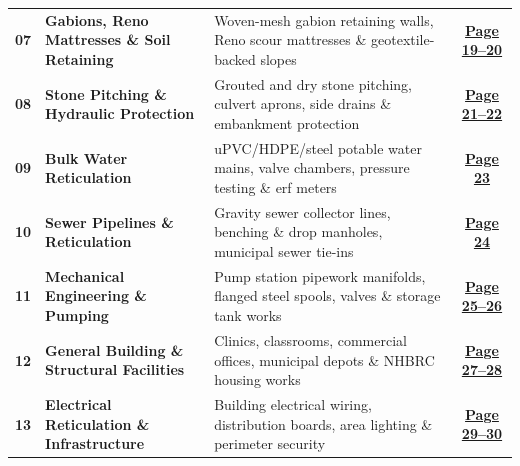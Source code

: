 \documentclass[a4paper,11pt]{article}
\begin{document}
\begin{tabularx}{\textwidth}{@{}l p{4.6cm} X c@{}}
\rowcolor{mhbluelight}
\fontsize{7.5pt}{9.1pt}\selectfont\bfseries 07 & \fontsize{7.5pt}{9.1pt}\selectfont\bfseries Gabions, Reno Mattresses \& Soil Retaining & \fontsize{7.5pt}{9.1pt}\selectfont Woven-mesh gabion retaining walls, Reno scour mattresses \& geotextile-backed slopes & \fontsize{7.5pt}{9.1pt}\selectfont\hyperlink{sec:gabions}{\bfseries\color{mhblue}Page 19--20} \\
\fontsize{7.5pt}{9.1pt}\selectfont\bfseries 08 & \fontsize{7.5pt}{9.1pt}\selectfont\bfseries Stone Pitching \& Hydraulic Protection & \fontsize{7.5pt}{9.1pt}\selectfont Grouted and dry stone pitching, culvert aprons, side drains \& embankment protection & \fontsize{7.5pt}{9.1pt}\selectfont\hyperlink{sec:pitching}{\bfseries\color{mhblue}Page 21--22} \\
\rowcolor{mhbluelight}
\fontsize{7.5pt}{9.1pt}\selectfont\bfseries 09 & \fontsize{7.5pt}{9.1pt}\selectfont\bfseries Bulk Water Reticulation & \fontsize{7.5pt}{9.1pt}\selectfont uPVC/HDPE/steel potable water mains, valve chambers, pressure testing \& erf meters & \fontsize{7.5pt}{9.1pt}\selectfont\hyperlink{sec:waterretic}{\bfseries\color{mhblue}Page 23} \\
\fontsize{7.5pt}{9.1pt}\selectfont\bfseries 10 & \fontsize{7.5pt}{9.1pt}\selectfont\bfseries Sewer Pipelines \& Reticulation & \fontsize{7.5pt}{9.1pt}\selectfont Gravity sewer collector lines, benching \& drop manholes, municipal sewer tie-ins & \fontsize{7.5pt}{9.1pt}\selectfont\hyperlink{sec:sewer}{\bfseries\color{mhblue}Page 24} \\
\rowcolor{mhbluelight}
\fontsize{7.5pt}{9.1pt}\selectfont\bfseries 11 & \fontsize{7.5pt}{9.1pt}\selectfont\bfseries Mechanical Engineering \& Pumping & \fontsize{7.5pt}{9.1pt}\selectfont Pump station pipework manifolds, flanged steel spools, valves \& storage tank works & \fontsize{7.5pt}{9.1pt}\selectfont\hyperlink{sec:mechanical}{\bfseries\color{mhblue}Page 25--26} \\
\fontsize{7.5pt}{9.1pt}\selectfont\bfseries 12 & \fontsize{7.5pt}{9.1pt}\selectfont\bfseries General Building \& Structural Facilities & \fontsize{7.5pt}{9.1pt}\selectfont Clinics, classrooms, commercial offices, municipal depots \& NHBRC housing works & \fontsize{7.5pt}{9.1pt}\selectfont\hyperlink{sec:building}{\bfseries\color{mhblue}Page 27--28} \\
\rowcolor{mhbluelight}
\fontsize{7.5pt}{9.1pt}\selectfont\bfseries 13 & \fontsize{7.5pt}{9.1pt}\selectfont\bfseries Electrical Reticulation \& Infrastructure & \fontsize{7.5pt}{9.1pt}\selectfont Building electrical wiring, distribution boards, area lighting \& perimeter security & \fontsize{7.5pt}{9.1pt}\selectfont\hyperlink{sec:electrical}{\bfseries\color{mhblue}Page 29--30} \\
\end{tabularx}
\renewcommand{\arraystretch}{1}
\end{document}
